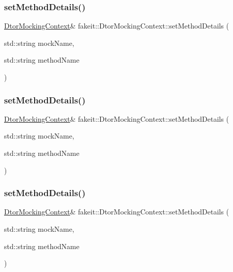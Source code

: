 \subsubsection{\texorpdfstring{setMethodDetails()}{setMethodDetails()}\hspace{0.1cm}{\footnotesize\ttfamily [2/9]}}
{\footnotesize\ttfamily \mbox{\hyperlink{classfakeit_1_1DtorMockingContext}{Dtor\+Mocking\+Context}}\& fakeit\+::\+Dtor\+Mocking\+Context\+::set\+Method\+Details (\begin{DoxyParamCaption}\item[{std\+::string}]{mock\+Name,  }\item[{std\+::string}]{method\+Name }\end{DoxyParamCaption})\hspace{0.3cm}{\ttfamily [inline]}}

\mbox{\label{classfakeit_1_1DtorMockingContext_ac2e3a23d87a1f48613dd5bf73f457309}} 
\subsubsection{\texorpdfstring{setMethodDetails()}{setMethodDetails()}\hspace{0.1cm}{\footnotesize\ttfamily [3/9]}}
{\footnotesize\ttfamily \mbox{\hyperlink{classfakeit_1_1DtorMockingContext}{Dtor\+Mocking\+Context}}\& fakeit\+::\+Dtor\+Mocking\+Context\+::set\+Method\+Details (\begin{DoxyParamCaption}\item[{std\+::string}]{mock\+Name,  }\item[{std\+::string}]{method\+Name }\end{DoxyParamCaption})\hspace{0.3cm}{\ttfamily [inline]}}

\mbox{\label{classfakeit_1_1DtorMockingContext_ac2e3a23d87a1f48613dd5bf73f457309}} 
\subsubsection{\texorpdfstring{setMethodDetails()}{setMethodDetails()}\hspace{0.1cm}{\footnotesize\ttfamily [4/9]}}
{\footnotesize\ttfamily \mbox{\hyperlink{classfakeit_1_1DtorMockingContext}{Dtor\+Mocking\+Context}}\& fakeit\+::\+Dtor\+Mocking\+Context\+::set\+Method\+Details (\begin{DoxyParamCaption}\item[{std\+::string}]{mock\+Name,  }\item[{std\+::string}]{method\+Name }\end{DoxyParamCaption})\hspace{0.3cm}{\ttfamily [inline]}}

